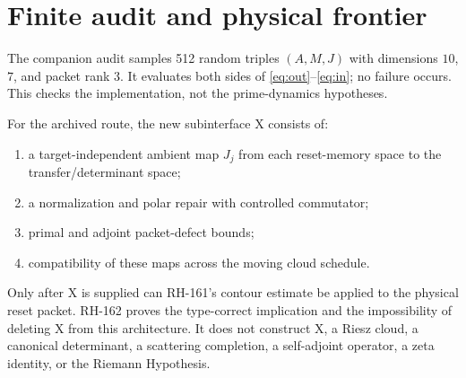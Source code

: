 \documentclass[12pt]{article}
\begin{document}
\section{Finite audit and physical frontier}
The companion audit samples 512 random triples $(A,M,J)$ with dimensions
$10$, $7$, and packet rank $3$.  It evaluates both sides of
\eqref{eq:out}--\eqref{eq:in}; no failure occurs.  This checks the
implementation, not the prime-dynamics hypotheses.

For the archived route, the new subinterface X consists of:
\begin{enumerate}
\item a target-independent ambient map $J_j$ from each reset-memory space to
the transfer/determinant space;
\item a normalization and polar repair with controlled commutator;
\item primal and adjoint packet-defect bounds;
\item compatibility of these maps across the moving cloud schedule.
\end{enumerate}
Only after X is supplied can RH-161's contour estimate be applied to the
physical reset packet.  RH-162 proves the type-correct implication and the
impossibility of deleting X from this architecture.  It does not construct
X, a Riesz cloud, a canonical determinant, a scattering completion, a
self-adjoint operator, a zeta identity, or the Riemann Hypothesis.



\end{document}
